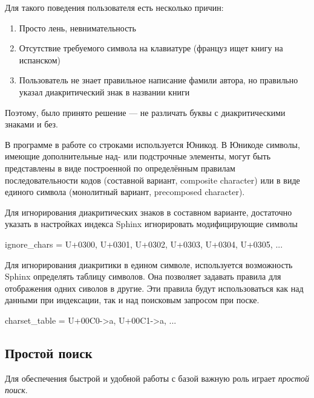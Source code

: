 Для такого поведения пользователя есть несколько причин:
\begin{enumerate}
    \item Просто лень, невнимательность 
    \item Отсутствие требуемого символа на клавиатуре (француз ищет книгу на испанском) 
    \item Пользователь не знает правильное написание фамили автора, но правильно указал диакритический знак в названии книги 
\end{enumerate}

Поэтому, было принято решение --- не различать буквы с диакритическими знаками и без.

В программе в работе со строками используется Юникод.
В Юникоде символы, имеющие дополнительные над- или подстрочные элементы, 
могут быть представлены в виде построенной по определённым правилам последовательности кодов (составной вариант, composite character) 
или в виде единого символа (монолитный вариант, precomposed character).

Для игнорирования диакритических знаков в составном варианте, достаточно указать в настройках индекса Sphinx игнорировать модифицирующие символы

ignore\_chars = U+0300, U+0301, U+0302, U+0303, U+0304, U+0305, ...

Для игнорирования диакритики в едином символе, используется возможность Sphinx определять таблицу символов. Она позволяет задавать правила для отображения одних сиволов в другие.
Эти правила будут использоваться как над данными при индексации, так и над поисковым запросом при поске.

charset\_table = U+00C0->a, U+00C1->a, ...


\subsection{Простой поиск}

Для обеспечения быстрой и удобной работы с базой важную роль играет {\em простой поиск}. 
